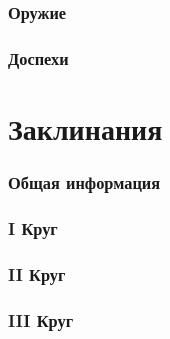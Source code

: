 \documentclass[10pt,twoside,twocolumn,openany]{book}
\begin{document}
\section{Оружие}
\lipsum[1]
\section{Доспехи}
\lipsum[1]

\part{Заклинания}
\section{Общая информация}
\lipsum[1]
\section{\textrm{I} Круг}
\lipsum[1]
\section{\textrm{II} Круг}
\lipsum[1]
\section{\textrm{III} Круг}
\lipsum[1]
\end{document}
